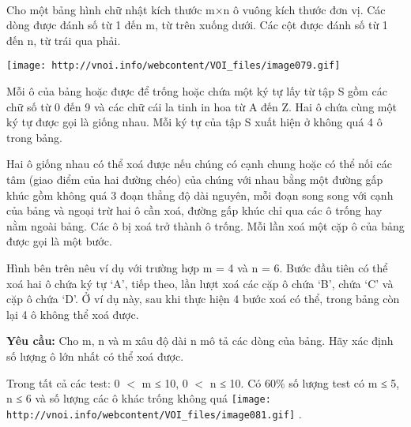  

Cho một bảng hình chữ nhật kích thước m×n ô vuông kích thước đơn vị. Các dòng được đánh số từ 1 đến m, từ trên xuống dưới. Các cột được đánh số từ 1 đến n, từ trái qua phải.


\texttt{[image: http://vnoi.info/webcontent/VOI\_files/image079.gif]}

Mỗi ô của bảng hoặc được để trống hoặc chứa một ký tự lấy từ tập S gồm các chữ số từ 0 đến 9 và các chữ cái la tinh in hoa từ A đến Z. Hai ô chứa cùng một ký tự được gọi là giống nhau. Mỗi ký tự của tập S xuất hiện ở không quá 4 ô trong bảng.

Hai ô giống nhau có thể xoá được nếu chúng có cạnh chung hoặc có thể nối các tâm (giao điểm của hai đường chéo) của chúng với nhau bằng một đường gấp khúc gồm không quá 3 đoạn thẳng độ dài nguyên, mỗi đoạn song song với cạnh của bảng và ngoại trừ hai ô cần xoá, đường gấp khúc chỉ qua các ô trống hay nằm ngoài bảng. Các ô bị xoá trở thành ô trống. Mỗi lần xoá một cặp ô của bảng được gọi là một bước.

Hình bên trên nêu ví dụ với trường hợp m = 4 và n = 6. Bước đầu tiên có thể xoá hai ô chứa ký tự ‘A’, tiếp theo, lần lượt xoá các cặp ô chứa ‘B’, chứa ‘C’ và cặp ô chứa ‘D’. Ở ví dụ này, sau khi thực hiện 4 bước xoá có thể, trong bảng còn lại 4 ô không thể xoá được.

\textbf{Yêu cầu: } Cho m, n và m xâu độ dài n mô tả các dòng của bảng. Hãy xác định số lượng ô lớn nhất có thể xoá được.

Trong tất cả các test: 0 $<$ m ≤ 10, 0 $<$ n ≤ 10. Có 60\% số lượng test có m ≤ 5, n ≤ 6 và số lượng các ô khác trống không quá 
\texttt{[image: http://vnoi.info/webcontent/VOI\_files/image081.gif]} .